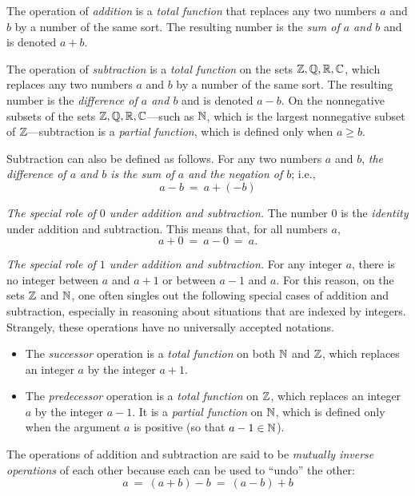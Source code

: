 The operation of {\it addition} is a {\em
  total function} that replaces any two numbers $a$ and $b$ by a
number of the same sort.  The resulting number is the {\em sum of $a$
  and $b$} and is denoted $a+b$.

\noindent
The operation of {\it subtraction} is a
{\em total function} on the sets $\mathbb{Z}, \mathbb{Q}, \mathbb{R}, \mathbb{C}$, which replaces any
two numbers $a$ and $b$ by a number of the same sort.  The resulting
number is the {\em difference of $a$ and $b$}
 and is denoted $a-b$.  On
the nonnegative subsets of the sets $\mathbb{Z}, \mathbb{Q}, \mathbb{R}, \mathbb{C}$---such as $\mathbb{N}$,
which is the largest nonnegative subset of $\mathbb{Z}$---subtraction is a
{\em partial function}, which is defined only when $a \geq b$.

Subtraction can also be defined as follows.  For any two numbers $a$
and $b$, {\em the difference of $a$ and $b$ is the sum of $a$ and the
  negation of $b$}; i.e.,
\[ a-b \ = \ a + (-b) \]

{\em The special role of $0$ under addition and subtraction.}
%
The number $0$ is the {\it identity} under addition and
  subtraction.
%
This means that, for all numbers $a$,
\[ a+0 \ = \ a-0 \ = \ a. \]

{\em The special role of $1$ under addition and subtraction.}
%
For any integer $a$, there is no integer between $a$ and $a+1$ or
between $a-1$ and $a$.  For this reason, on the sets $\mathbb{Z}$ and $\mathbb{N}$,
one often singles out the following special cases of addition and
subtraction, especially in reasoning about situations that are indexed
by integers.  Strangely, these operations have no universally accepted
notations.
\begin{itemize}
\item
The {\it successor} operation is
a {\em total function} on both $\mathbb{N}$ and $\mathbb{Z}$, which replaces an
integer $a$ by the integer $a+1$.
\item
The {\it predecessor} operation
is a {\em total function} on $\mathbb{Z}$, which replaces an integer $a$ by
the integer $a-1$.  It is a {\em partial function} on $\mathbb{N}$, which is
defined only when the argument $a$ is positive (so that $a-1 \in \mathbb{N}$).
\end{itemize}

The operations of addition and subtraction are said to be {\em
  mutually inverse operations}  of each other because each can be used to ``undo''
the other:
\[
a \ = \ (a+b) -b \ = \ (a-b) +b
\]

